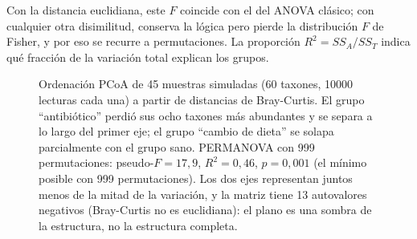 \begin{simbolos}
\end{simbolos}

Con la distancia euclidiana, este $F$ coincide con el del ANOVA clásico; con cualquier otra disimilitud, conserva la lógica pero pierde la distribución $F$ de Fisher, y por eso se recurre a permutaciones. La proporción $R^2 = SS_A/SS_T$ indica qué fracción de la variación total explican los grupos.

\begin{figure}[t]
\centering

\caption[PCoA de distancias de Bray-Curtis]{Ordenación PCoA de 45 muestras simuladas (60 taxones, \num{10000} lecturas cada una) a partir de distancias de Bray-Curtis. El grupo ``antibiótico'' perdió sus ocho taxones más abundantes y se separa a lo largo del primer eje; el grupo ``cambio de dieta'' se solapa parcialmente con el grupo sano. PERMANOVA con 999 permutaciones: pseudo-$F=17{,}9$, $R^2 = 0{,}46$, $p=0{,}001$ (el mínimo posible con 999 permutaciones). Los dos ejes representan juntos menos de la mitad de la variación, y la matriz tiene 13 autovalores negativos (Bray-Curtis no es euclidiana): el plano es una sombra de la estructura, no la estructura completa.}
\label{fig:14-pcoa}
\end{figure}

